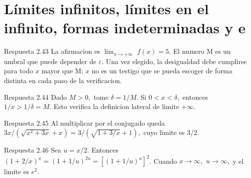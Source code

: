 \documentclass[10pt,a4paper,oneside,openany]{book}
\begin{document}
\section{Límites infinitos, límites en el infinito, formas indeterminadas y e}
\begin{PSevenAnswerFixed}{Respuesta 2.43}
La afirmacion es \(\lim_{x\to +\infty }\) \(f(x)=5\). El numero M es un umbral que puede depender de \(\varepsilon \). Una vez elegido, la desigualdad debe cumplirse para todo \(x\) mayor que M; \(x\) no es un testigo que se pueda escoger de forma distinta en cada paso de la verificacion.
\end{PSevenAnswerFixed}
\begin{PSevenAnswerFixed}{Respuesta 2.44}
Dado \(M>0,\) tome \(\delta =1/M\). Si \(0<x<\delta ,\) entonces \(1/x>1/\delta =M\). Esto verifica la definicion lateral de limite \(+\infty \).
\end{PSevenAnswerFixed}
\begin{PSevenAnswerFixed}{Respuesta 2.45}
Al multiplicar por el conjugado queda \(3x/(\sqrt{x^{2}+3x}+x)=3/(\sqrt{1+3/x}+1),\) cuyo limite es \(3/2\).
\end{PSevenAnswerFixed}
\begin{PSevenAnswerFixed}{Respuesta 2.46}
Sea \(u=x/2\). Entonces \((1+2/x)^x=(1+1/u)^{2u}=[(1+1/u)^u]^{2}\). Cuando \(x\to \infty ,\) \(u\to \infty ,\) y el limite es \(e^{2}\).
\end{PSevenAnswerFixed}
\end{document}
